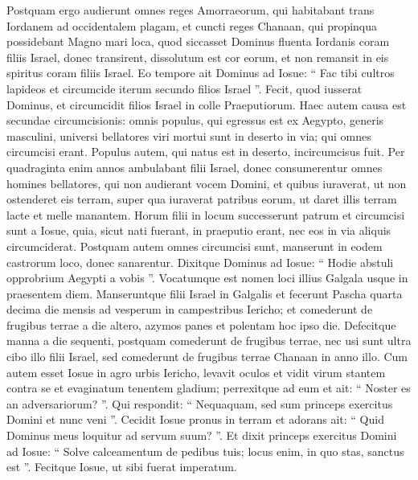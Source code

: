 \begin{biblechapter}
\begin{biblechapter}
\begin{biblechapter}
\begin{biblechapter}
\begin{biblechapter}
\verse Postquam ergo audierunt omnes reges Amorraeorum, qui habitabant trans Iordanem ad occidentalem plagam, et cuncti reges Chanaan, qui propinqua possidebant Magno mari loca, quod siccasset Dominus fluenta Iordanis coram filiis Israel, donec transirent, dissolutum est cor eorum, et non remansit in eis spiritus coram filiis Israel.
 \verse Eo tempore ait Dominus ad Iosue: “ Fac tibi cultros lapideos et circumcide iterum secundo filios Israel ”. 
\verse Fecit, quod iusserat Dominus, et circumcidit filios Israel in colle Praeputiorum.
 \verse Haec autem causa est secundae circumcisionis: omnis populus, qui egressus est ex Aegypto, generis masculini, universi bellatores viri mortui sunt in deserto in via; 
\verse qui omnes circumcisi erant. Populus autem, qui natus est in deserto, incircumcisus fuit. 
\verse Per quadraginta enim annos ambulabant filii Israel, donec consumerentur omnes homines bellatores, qui non audierant vocem Domini, et quibus iuraverat, ut non ostenderet eis terram, super qua iuraverat patribus eorum, ut daret illis terram lacte et melle manantem. 
\verse Horum filii in locum successerunt patrum et circumcisi sunt a Iosue, quia, sicut nati fuerant, in praeputio erant, nec eos in via aliquis circumciderat. 
\verse Postquam autem omnes circumcisi sunt, manserunt in eodem castrorum loco, donec sanarentur. 
\verse Dixitque Dominus ad Iosue: “ Hodie abstuli opprobrium Aegypti a vobis ”. Vocatumque est nomen loci illius Galgala usque in praesentem diem.
 \verse Manseruntque filii Israel in Galgalis et fecerunt Pascha quarta decima die mensis ad vesperum in campestribus Iericho; 
\verse et comederunt de frugibus terrae a die altero, azymos panes et polentam hoc ipso die. 
\verse Defecitque manna a die sequenti, postquam comederunt de frugibus terrae, nec usi sunt ultra cibo illo filii Israel, sed comederunt de frugibus terrae Chanaan in anno illo.
 \verse Cum autem esset Iosue in agro urbis Iericho, levavit oculos et vidit virum stantem contra se et evaginatum tenentem gladium; perrexitque ad eum et ait: “ Noster es an adversariorum? ”. 
\verse Qui respondit: “ Nequaquam, sed sum princeps exercitus Domini et nunc veni ”. 
\verse Cecidit Iosue pronus in terram et adorans ait: “ Quid Dominus meus loquitur ad servum suum? ”. 
\verse Et dixit princeps exercitus Domini ad Iosue: “ Solve calceamentum de pedibus tuis; locus enim, in quo stas, sanctus est ”. Fecitque Iosue, ut sibi fuerat imperatum.
 

\end{biblechapter}
\end{biblechapter}
\end{biblechapter}
\end{biblechapter}
\end{biblechapter}
